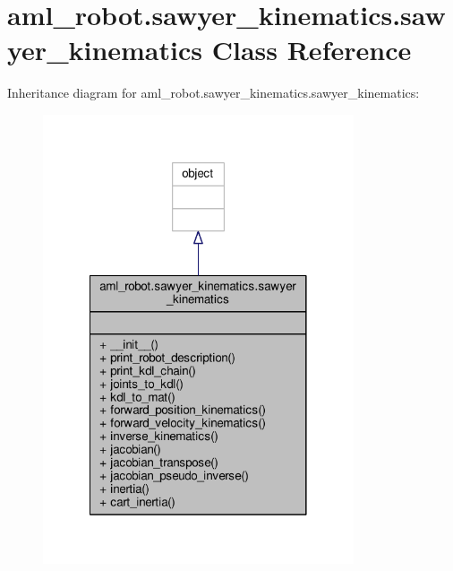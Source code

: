 \hypertarget{classaml__robot_1_1sawyer__kinematics_1_1sawyer__kinematics}{\section{aml\-\_\-robot.\-sawyer\-\_\-kinematics.\-sawyer\-\_\-kinematics Class Reference}
\label{classaml__robot_1_1sawyer__kinematics_1_1sawyer__kinematics}
}


Inheritance diagram for aml\-\_\-robot.\-sawyer\-\_\-kinematics.\-sawyer\-\_\-kinematics\-:\nopagebreak
\begin{figure}[H]
\begin{center}
\leavevmode
\includegraphics[width=260pt]{classaml__robot_1_1sawyer__kinematics_1_1sawyer__kinematics__inherit__graph}
\end{center}
\end{figure}


